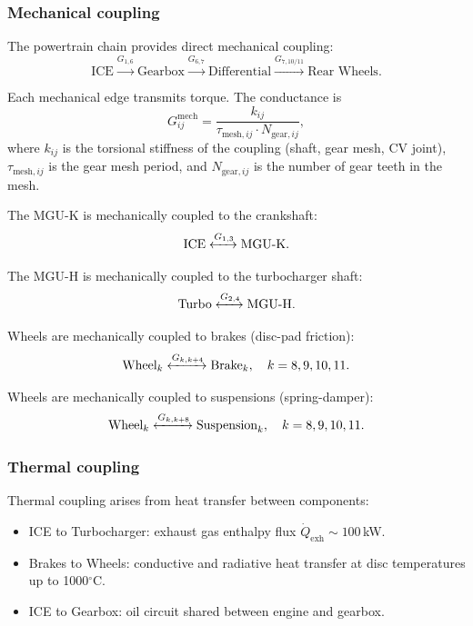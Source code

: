 \documentclass[twocolumn,10pt,a4paper]{article}
\theoremstyle{definition}
\theoremstyle{remark}
\begin{document}
\subsubsection{Mechanical coupling}

The powertrain chain provides direct mechanical coupling:
\begin{equation}\label{eq:mech_chain}
    \text{ICE} \xrightarrow{G_{1,6}} \text{Gearbox} \xrightarrow{G_{6,7}} \text{Differential} \xrightarrow{G_{7,10/11}} \text{Rear Wheels}.
\end{equation}

Each mechanical edge transmits torque. The conductance is
\begin{equation}\label{eq:mech_G}
    G_{ij}^{\mathrm{mech}} = \frac{k_{ij}}{\tau_{\mathrm{mesh},ij} \cdot N_{\mathrm{gear},ij}},
\end{equation}
where $k_{ij}$ is the torsional stiffness of the coupling (shaft, gear mesh, CV joint), $\tau_{\mathrm{mesh},ij}$ is the gear mesh period, and $N_{\mathrm{gear},ij}$ is the number of gear teeth in the mesh.

The MGU-K is mechanically coupled to the crankshaft:
\begin{equation}\label{eq:mguk_mech}
    \text{ICE} \xleftrightarrow{G_{1,3}} \text{MGU-K}.
\end{equation}

The MGU-H is mechanically coupled to the turbocharger shaft:
\begin{equation}\label{eq:mguh_mech}
    \text{Turbo} \xleftrightarrow{G_{2,4}} \text{MGU-H}.
\end{equation}

Wheels are mechanically coupled to brakes (disc-pad friction):
\begin{equation}\label{eq:brake_mech}
    \text{Wheel}_k \xleftrightarrow{G_{k,k+4}} \text{Brake}_k, \quad k = 8, 9, 10, 11.
\end{equation}

Wheels are mechanically coupled to suspensions (spring-damper):
\begin{equation}\label{eq:susp_mech}
    \text{Wheel}_k \xleftrightarrow{G_{k,k+8}} \text{Suspension}_k, \quad k = 8, 9, 10, 11.
\end{equation}

\subsubsection{Thermal coupling}

Thermal coupling arises from heat transfer between components:
\begin{itemize}
    \item ICE to Turbocharger: exhaust gas enthalpy flux $\dot{Q}_{\mathrm{exh}} \sim 100$\,kW.
    \item Brakes to Wheels: conductive and radiative heat transfer at disc temperatures up to 1000$^\circ$C.
    \item ICE to Gearbox: oil circuit shared between engine and gearbox.
\end{itemize}
\end{document}
